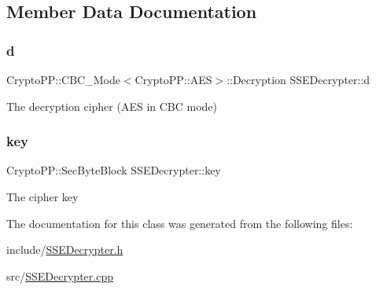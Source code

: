 \subsection{Member Data Documentation}
\mbox{\label{classSSEDecrypter_a339c0a434bd2a434b548d9d9e6d6762c}} 
\subsubsection{\texorpdfstring{d}{d}}
{\footnotesize\ttfamily Crypto\+P\+P\+::\+C\+B\+C\+\_\+\+Mode$<$Crypto\+P\+P\+::\+A\+ES$>$\+::Decryption S\+S\+E\+Decrypter\+::d\hspace{0.3cm}{\ttfamily [private]}}

The decryption cipher (A\+ES in C\+BC mode) \mbox{\label{classSSEDecrypter_a05c8a6317f2de2cfd37c5474d616d16a}} 
\subsubsection{\texorpdfstring{key}{key}}
{\footnotesize\ttfamily Crypto\+P\+P\+::\+Sec\+Byte\+Block S\+S\+E\+Decrypter\+::key\hspace{0.3cm}{\ttfamily [private]}}

The cipher key 

The documentation for this class was generated from the following files\+:\begin{DoxyCompactItemize}
\item 
include/\hyperlink{SSEDecrypter_8h}{S\+S\+E\+Decrypter.\+h}\item 
src/\hyperlink{SSEDecrypter_8cpp}{S\+S\+E\+Decrypter.\+cpp}\end{DoxyCompactItemize}
